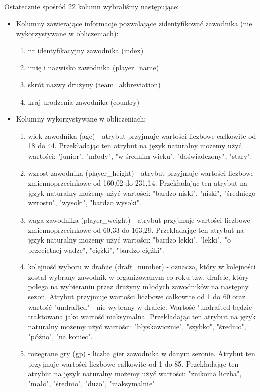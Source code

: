 \documentclass{classrep}
\begin{document}
\noindent Ostatecznie spośród 22 kolumn wybraliśmy następujące:
\begin{itemize}
    \item Kolumny zawierające informacje pozwalające zidentyfikować zawodnika (nie wykorzystywane w obliczeniach):
    \begin{enumerate}
        \item nr identyfikacyjny zawodnika (index)
        \item imię i nazwisko zawodnika (player\_name)
        \item skrót nazwy drużyny (team\_abbreviation)
        \item kraj urodzenia zawodnika (country)
    \end{enumerate}
    \item Kolumny wykorzystywane w obliczeniach:
    \begin{enumerate}
        \item wiek zawodnika (age) - atrybut przyjmuje wartości liczbowe całkowite od 18 do 44. Przekładając ten atrybut na język naturalny możemy użyć wartości: "junior", "młody", "w średnim wieku", "doświadczony", "stary". 
        \item wzrost zawodnika (player\_height) - atrybut przyjmuje wartości liczbowe zmiennoprzecinkowe od 160,02 do 231,14. Przekładając ten atrybut na język naturalny możemy użyć wartości: "bardzo niski", "niski", "średniego wzrostu", "wysoki", "bardzo wysoki".
        \item waga zawodnika (player\_weight) - atrybut przyjmuje wartości liczbowe zmiennoprzecinkowe od 60,33 do 163,29. Przekładając ten atrybut na język naturalny możemy użyć wartości: "bardzo lekki", "lekki", "o przeciętnej wadze", "ciężki", "bardzo ciężki".
        \item kolejność wyboru w drafcie (draft\_number) - oznacza, który w kolejności został wybrany zawodnik w organizowanym co roku tzw. drafcie, który polega na wybieraniu przez drużyny młodych zawodników na następny sezon. Atrybut przyjmuje wartości liczbowe całkowite od 1 do 60 oraz wartość "undrafted" - nie wybrany w drafcie. Wartość "undrafted będzie traktowana jako wartość maksymalna. Przekładając ten atrybut na język naturalny możemy użyć wartości: "błyskawicznie", "szybko", "średnio", "późno", "na koniec".
        \item rozegrane gry (gp) - liczba gier zawodnika w danym sezonie. Atrybut ten przyjmuje wartości liczbowe całkowite od 1 do 85.  Przekładając ten atrybut na język naturalny możemy użyć wartości: "znikoma liczba", "mało", "średnio", "dużo", "maksymalnie".

\end{enumerate}
\end{itemize}
\end{document}
